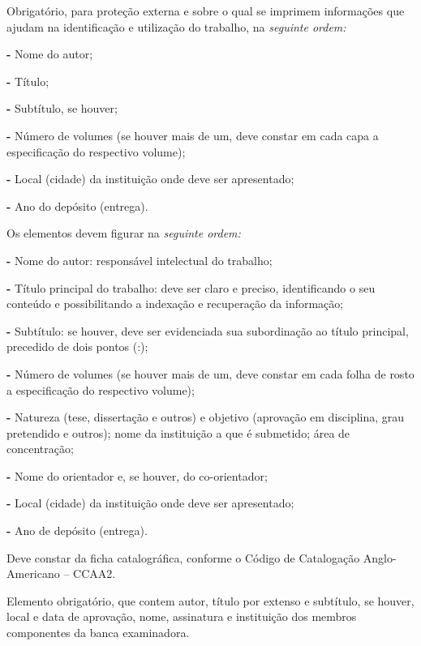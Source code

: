 \documentclass[espaco=simples,appendix=Name]{abnt}
\newcommand{\descrtype}{descriptionbf}
\renewenvironment{description}%
  {\expandafter\csname\descrtype\endcsname\edef\enddescrtype{end\descrtype}}
  {\expandafter\csname\enddescrtype\endcsname}
\begin{document}
{\def\descrtype{descriptionit}
\begin{description}\setlength{\parskip}{0cm}
\item[Capa] \cite[4.1.1]{NBR14724:2001} Obrigatório, para proteção
  externa e sobre o qual se imprimem informações que ajudam na
  identificação e utilização do trabalho, na \emph{seguinte ordem:}

{\bf-} Nome do autor;

{\bf-} Título;

{\bf-} Subtítulo, se houver;

{\bf-} Número de volumes (se houver mais de um, deve constar em cada capa a
  especificação do respectivo volume);

{\bf-} Local (cidade) da instituição onde deve ser apresentado;

{\bf-} Ano do depósito (entrega).

\item[Folha de rosto (Anverso)] \cite[4.1.2]{NBR14724:2001}
Os elementos devem figurar na \emph{seguinte ordem:}

{\bf-} Nome do autor: responsável intelectual do trabalho;

{\bf-} Título principal do trabalho: deve ser claro e preciso, identificando
  o seu conteúdo e possibilitando a indexação e recuperação da informação;

{\bf-} Subtítulo: se houver, deve ser evidenciada sua subordinação ao título
  principal, precedido de dois pontos (:);

{\bf-} Número de volumes (se houver mais de um, deve constar em cada folha
  de rosto a especificação do respectivo volume);

{\bf-} Natureza (tese, dissertação e outros) e objetivo (aprovação em
  disciplina, grau pretendido e outros); nome da instituição a que é
  submetido; área de concentração;

{\bf-} Nome do orientador e, se houver, do co-orientador;

{\bf-} Local (cidade) da instituição onde deve ser apresentado;

{\bf-} Ano de depósito (entrega).

\item[Folha de rosto (Verso)] \cite[4.1.2]{NBR14724:2001} Deve constar
  da ficha catalográfica, conforme o Código de Catalogação Anglo-Americano
  -- CCAA2. 



\item[Folha de aprovação] \cite[4.1.4]{NBR14724:2001} Elemento
  obrigatório, que contem autor, título por extenso e subtítulo, se houver,
  local e data de aprovação, nome, assinatura e instituição dos membros
  componentes da banca examinadora. 



\end{description}}
\end{document}
